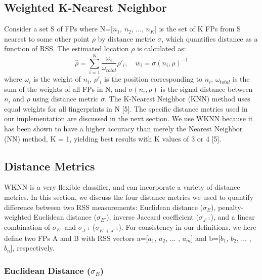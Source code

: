 \documentclass[conference]{IEEEtran}
\begin{document}
\subsection{Weighted K-Nearest Neighbor}
\indent Consider a set S of FPs  where N=[$n_1$, $n_2$, ..., $n_K$] is the set of K FPs from S nearest to some other point $\rho$ by distance metric $\sigma$, which quantifies distance as a function of RSS. The estimated location $\rho$ is calculated as:
\begin{equation}
\label{wknn}
\hat{\rho} = \sum\limits_{i=1}^{K}\frac{\omega_i}{\omega_{total}}\rho'_i, \quad w_i = \sigma(n_i, \rho)^{-1}
\end{equation}
where $\omega_i$ is the weight of $n_i$, $\rho'_i$ is the position corresponding to $n_i$, $\omega_{total}$ is the sum of the weights of all FPs in N, and $\sigma(n_i, \rho)$ is the signal distance between $n_i$ and $\rho$ using distance metric $\sigma$. The K-Nearest Neighbor (KNN) method uses equal weights for all fingerprints in N [5]. The specific distance metrics used in our implementation are discussed in the next section. We use WKNN because it has been shown to have a higher accuracy than merely the Nearest Neighbor (NN) method, K = 1, yielding best results with K values of 3 or 4 [5]. 

\subsection{Distance Metrics}
WKNN is a very flexible classifier, and can incorporate a variety of distance metrics. In this section, we discuss the four distance metrics we used to quantify difference between two RSS measurements: Euclidean distance ($\sigma_E$), penalty-weighted Euclidean distance ($\sigma_{E'}$), inverse Jaccard coefficient ($\sigma_{J^{-1}}$), and a linear combination of $\sigma_{E'}$ and $\sigma_{J^{-1}}$ ($\sigma_{E' + J^{-1}}$). For consistency in our definitions, we here define two FPs A and B with RSS vectors a=[$a_1$, $a_2$, ... , $a_m$] and b=[$b_1$, $b_2$, ... , $b_n$], respectively. 

\subsubsection{Euclidean Distance ($\sigma_E$)}
\end{document}
